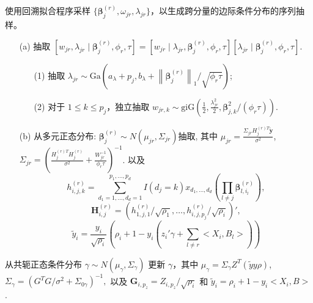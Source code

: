 \documentclass[AutoFakeBold]{LZUThesis}
\begin{document}
\begin{algorithm}
\begin{algorithmic}[1]
		\State 使用回溯拟合程序采样 $\{\boldsymbol{\beta}_j^{(r)}, \omega_{jr}, \lambda_{jr}\}$，以生成跨分量的边际条件分布的序列抽样。
		\begin{itemize}
			\item [(a)]抽取 $[w_{jr}, \lambda_{jr} \mid \boldsymbol{\beta}_j^{(r)}, \phi_r, \tau] = [w_{jr} \mid \lambda_{jr}, \boldsymbol{\beta}_j^{(r)}, \phi_r, \tau][\lambda_{jr} \mid \boldsymbol{\beta}_j^{(r)}, \phi_r, \tau]$.
			\begin{itemize}
				\item [(1)]抽取 $\lambda_{jr} \sim \text{Ga}\left(a_{\lambda} + p_j, b_{\lambda} + \left\|\boldsymbol{\beta}_j^{(r)}\right\|_1 / \sqrt{\phi_r \tau}\right)$;
				\item [(2)]对于 $1 \le k \le p_j$，独立抽取 $w_{jr,k} \sim \text{giG}\left(\frac{1}{2}, \frac{\lambda_{jr}^2}{2}, \boldsymbol{\beta}_{j,k}^2 / (\phi_r \tau)\right)$.
			\end{itemize}
			\item [(b)]从多元正态分布: $\boldsymbol{\beta}_j^{(r)} \sim N(\mu_{jr}, \Sigma_{jr})$抽取, 其中
			$\mu_{jr} = \frac{\Sigma_{jr} H_j^{(r)T} \tilde{\boldsymbol{y}}}{\sigma^2}$, $\Sigma_{jr} = \left(\frac{H_j^{(r)T} H_j^{(r)}}{\sigma^2} + \frac{W_{jr}^{-1}}{\phi_r \tau}\right)^{-1}$.
			以及
			$$
			h_{i,j,k}^{(r)} = \sum_{d_1=1,\dots,d_d=1}^{p_1,\dots,p_d} I(d_j=k) x_{d_1,\dots,d_d} \left(\prod_{l \ne j} \boldsymbol{\beta}_{l,i_l}^{(r)}\right),
			$$
			$$
			\boldsymbol{H}_{i,j}^{(r)} = (h_{1,j,1}^{(r)}/\sqrt{\rho_1}, \dots, h_{i,j,p_j}^{(r)}/\sqrt{\rho_i})',
			$$
			$$
			\tilde{y}_i = \frac{y_i}{\sqrt{\rho_i}} (\rho_i + 1 - y_i(z_i'\gamma + \sum_{l \ne r} < X_i, B_l >))
			$$
		\end{itemize}
		
		\State 从共轭正态条件分布 $\gamma \sim N(\mu_\gamma, \Sigma_\gamma)$ 更新 $\gamma$，其中
		$
		\mu_\gamma = \Sigma_\gamma Z^T(\tilde{y}y\rho)$, $ \Sigma_\gamma = (G^T G/\sigma^2 + \Sigma_{0\gamma})^{-1},
		$
		以及 $\boldsymbol{G}_{i,p_z} = Z_{i,p_z}/\sqrt{\rho_i}$ 和 $\tilde{y}_i = \rho_i + 1 - y_i < X_i, B >$.
		
	\end{algorithmic}
\end{algorithm}
\newpage
\end{document}
